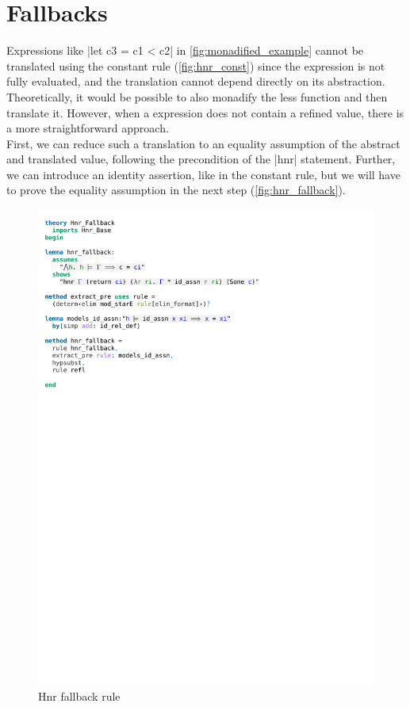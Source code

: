 \section{Fallbacks}

Expressions like |let c3 = c1 < c2| in \autoref{fig:monadified_example} cannot be translated using the constant rule (\autoref{fig:hnr_const}) since the expression is not fully evaluated, and the translation cannot depend directly on its abstraction. Theoretically, it would be possible to also monadify the less function and then translate it. However, when a expression does not contain a refined value, there is a more straightforward approach.\\
First, we can reduce such a translation to an equality assumption of the abstract and translated value, following the precondition of the |hnr| statement. Further, we can introduce an identity assertion, like in the constant rule, but we will have to prove the equality assumption in the next step (\autoref{fig:hnr_fallback}). 

\begin{figure}[htpb]
    \includegraphics[trim={0 24,8cm 0 2,4cm}, clip, width=1.00\textwidth]{figures/Theory_Hnr_Fallback.pdf}
    \caption[Hnr fallback rule]{Hnr fallback rule}
    \label{fig:hnr_fallback}
\end{figure}

